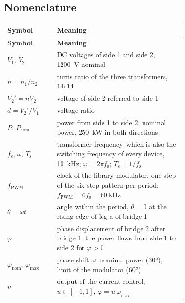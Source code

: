\documentclass[12pt,a4paper]{scrartcl}
\newcommand{\ped}[1]{_{\mathrm{#1}}}
\begin{document}


\tableofcontents
\listoffigures
\listoftables
\newpage

\begin{onehalfspace}

\section*{Nomenclature}
\label{sec:nomenclature}

\begingroup
{}
\begin{longtable}{@{} l p{0.72\linewidth} @{}}
	\toprule
	\textbf{Symbol} & \textbf{Meaning} \\
	\midrule
	\endfirsthead
	\toprule
	\textbf{Symbol} & \textbf{Meaning} \\
	\midrule
	\endhead
	\bottomrule
	\endfoot
	\bottomrule
	\endlastfoot
	$V\ped{1}$, $V\ped{2}$ & DC voltages of side 1 and side 2, \SI{1200}{\volt} nominal \\
	$n = n\ped{1}/n\ped{2}$ & turns ratio of the three transformers, $14:14$ \\
	$V\ped{2}' = n V\ped{2}$ & voltage of side 2 referred to side 1 \\
	$d = V\ped{2}'/V\ped{1}$ & voltage ratio \\
	$P$, $P\ped{nom}$ & power from side 1 to side 2; nominal power, \SI{250}{\kilo\watt} in both directions \\
	$f\ped{s}$, $\omega$, $T\ped{s}$ & transformer frequency, which is also the switching frequency of every device, \SI{10}{\kilo\hertz}; $\omega = 2\pi f\ped{s}$; $T\ped{s} = 1/f\ped{s}$ \\
	$f\ped{PWM}$ & clock of the library modulator, one step of the six-step pattern per period: $f\ped{PWM} = 6 f\ped{s} = \SI{60}{\kilo\hertz}$ \\
	$\theta = \omega t$ & angle within the period, $\theta = 0$ at the rising edge of leg a of bridge 1 \\
	$\varphi$ & phase displacement of bridge 2 after bridge 1; the power flows from side 1 to side 2 for $\varphi > 0$ \\
	$\varphi\ped{nom}$, $\varphi\ped{max}$ & phase shift at nominal power (\ang{30}); limit of the modulator (\ang{60}) \\
	$u$ & output of the current control, $u \in [-1, 1]$, $\varphi = u\,\varphi\ped{max}$ \\

\end{longtable}
\end{onehalfspace}
\end{document}
